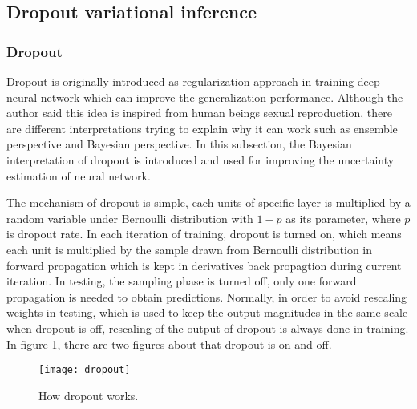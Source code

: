 \subsection{Dropout variational inference}
\subsubsection{Dropout}
Dropout\cite{srivastava2014dropout} is originally introduced as regularization approach in training deep neural network which can improve the generalization performance. Although the author said this idea is inspired from human beings sexual reproduction, there are different interpretations trying to explain why it can work such as ensemble perspective and Bayesian perspective. In this subsection, the Bayesian interpretation of dropout is introduced and used for improving the uncertainty estimation of neural network. 

The mechanism of dropout is simple, each units of specific layer is multiplied by a random variable under Bernoulli distribution with $1-p$ as its parameter, where $p$ is dropout rate. In each iteration of training, dropout is turned on, which means each unit is multiplied by the sample drawn from Bernoulli distribution in forward propagation which is kept in  derivatives back propagtion during current iteration. In testing, the sampling phase is turned off, only one forward propagation is needed to obtain predictions. Normally, in order to avoid rescaling weights in testing, which is used to keep the output magnitudes in the same scale when dropout is off, rescaling of the output of dropout is always done in training. In figure \ref{fig:dropout}, there are two figures about that dropout is on and off. 
\begin{figure}[h!]
	\begin{center}
		\texttt{[image: dropout]}
		\caption{How dropout works\cite{srivastava2014dropout}.}		
		\label{fig:dropout}
	\end{center}
\end{figure}


